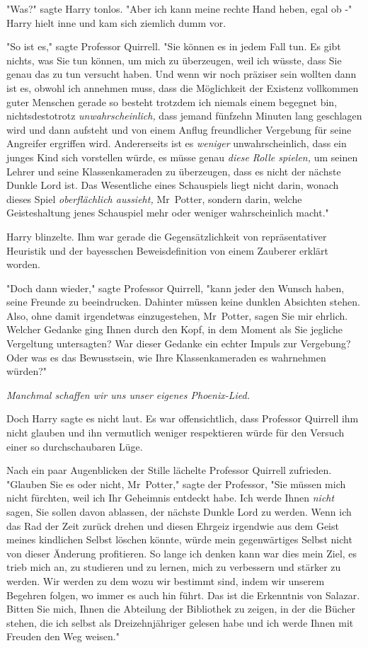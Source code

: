 {"Was?" sagte Harry tonlos. "Aber ich kann meine rechte Hand heben, egal ob -" Harry hielt inne und kam sich ziemlich dumm vor.

"So ist es," sagte Professor Quirrell. "Sie können es in jedem Fall tun. Es gibt nichts, was Sie tun können, um mich zu überzeugen, weil ich wüsste, dass Sie genau das zu tun versucht haben. Und wenn wir noch präziser sein wollten dann ist es, obwohl ich annehmen muss, dass die Möglichkeit der Existenz vollkommen guter Menschen gerade so besteht trotzdem ich niemals einem begegnet bin, nichtsdestotrotz \emph{unwahrscheinlich,} dass jemand fünfzehn Minuten lang geschlagen wird und dann aufsteht und von einem Anflug freundlicher Vergebung für seine Angreifer ergriffen wird. Andererseits ist es \emph{weniger} unwahrscheinlich, dass ein junges Kind sich vorstellen würde, es müsse genau \emph{diese Rolle spielen,} um seinen Lehrer und seine Klassenkameraden zu überzeugen, dass es nicht der nächste Dunkle Lord ist. Das Wesentliche eines Schauspiels liegt nicht darin, wonach dieses Spiel \emph{oberflächlich aussieht,} Mr~Potter, sondern darin, welche Geisteshaltung jenes Schauspiel mehr oder weniger wahrscheinlich macht."

Harry blinzelte. Ihm war gerade die Gegensätzlichkeit von repräsentativer Heuristik und der bayesschen Beweisdefinition von einem Zauberer erklärt worden.

"Doch dann wieder," sagte Professor Quirrell, "kann jeder den Wunsch haben, seine Freunde zu beeindrucken. Dahinter müssen keine dunklen Absichten stehen. Also, ohne damit irgendetwas einzugestehen, Mr~Potter, sagen Sie mir ehrlich. Welcher Gedanke ging Ihnen durch den Kopf, in dem Moment als Sie jegliche Vergeltung untersagten? War dieser Gedanke ein echter Impuls zur Vergebung? Oder was es das Bewusstsein, wie Ihre Klassenkameraden es wahrnehmen würden?"

\emph{Manchmal schaffen wir uns unser eigenes Phoenix-Lied.}

Doch Harry sagte es nicht laut. Es war offensichtlich, dass Professor Quirrell ihm nicht glauben und ihn vermutlich weniger respektieren würde für den Versuch einer so durchschaubaren Lüge.

Nach ein paar Augenblicken der Stille lächelte Professor Quirrell zufrieden. "Glauben Sie es oder nicht, Mr~Potter," sagte der Professor, "Sie müssen mich nicht fürchten, weil ich Ihr Geheimnis entdeckt habe. Ich werde Ihnen \emph{nicht} sagen, Sie sollen davon ablassen, der nächste Dunkle Lord zu werden. Wenn ich das Rad der Zeit zurück drehen und diesen Ehrgeiz irgendwie aus dem Geist meines kindlichen Selbst löschen könnte, würde mein gegenwärtiges Selbst nicht von dieser Änderung profitieren. So lange ich denken kann war dies mein Ziel, es trieb mich an, zu studieren und zu lernen, mich zu verbessern und stärker zu werden. Wir werden zu dem wozu wir bestimmt sind, indem wir unserem Begehren folgen, wo immer es auch hin führt. Das ist die Erkenntnis von Salazar. Bitten Sie mich, Ihnen die Abteilung der Bibliothek zu zeigen, in der die Bücher stehen, die ich selbst als Dreizehnjähriger gelesen habe und ich werde Ihnen mit Freuden den Weg weisen."

}

